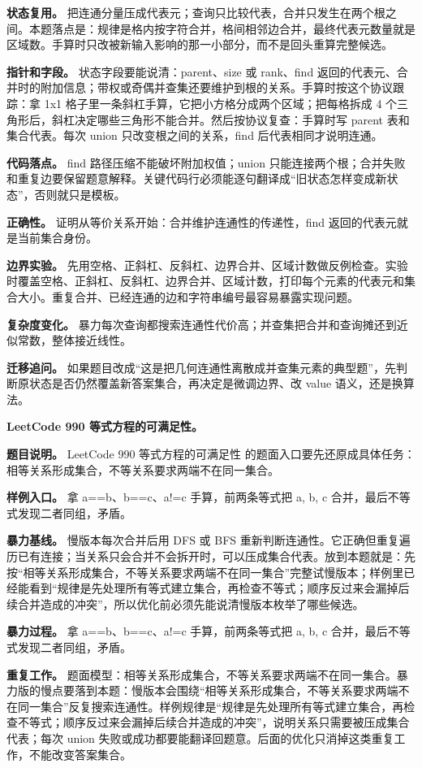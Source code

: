 \textbf{状态复用。} 把连通分量压成代表元；查询只比较代表，合并只发生在两个根之间。本题落点是：规律是格内按字符合并，格间相邻边合并，最终代表元数量就是区域数。手算时只改被新输入影响的那一小部分，而不是回头重算完整候选。

\textbf{指针和字段。} 状态字段要能说清：parent、size 或 rank、find 返回的代表元、合并时的附加信息；带权或奇偶并查集还要维护到根的关系。手算时按这个协议跟踪：拿 1x1 格子里一条斜杠手算，它把小方格分成两个区域；把每格拆成 4 个三角形后，斜杠决定哪些三角形不能合并。然后按协议复查：手算时写 parent 表和集合代表。每次 union 只改变根之间的关系，find 后代表相同才说明连通。

\textbf{代码落点。} find 路径压缩不能破坏附加权值；union 只能连接两个根；合并失败和重复边要保留题意解释。关键代码行必须能逐句翻译成“旧状态怎样变成新状态”，否则就只是模板。

\textbf{正确性。} 证明从等价关系开始：合并维护连通性的传递性，find 返回的代表元就是当前集合身份。

\textbf{边界实验。} 先用空格、正斜杠、反斜杠、边界合并、区域计数做反例检查。实验时覆盖空格、正斜杠、反斜杠、边界合并、区域计数，打印每个元素的代表元和集合大小。重复合并、已经连通的边和字符串编号最容易暴露实现问题。

\textbf{复杂度变化。} 暴力每次查询都搜索连通性代价高；并查集把合并和查询摊还到近似常数，整体接近线性。

\textbf{迁移追问。} 如果题目改成“这是把几何连通性离散成并查集元素的典型题”，先判断原状态是否仍然覆盖新答案集合，再决定是微调边界、改 value 语义，还是换算法。

\noindent\textbf{LeetCode 990 等式方程的可满足性。}

\textbf{题目说明。} LeetCode 990 等式方程的可满足性 的题面入口要先还原成具体任务：相等关系形成集合，不等关系要求两端不在同一集合。

\textbf{样例入口。} 拿 a==b、b==c、a!=c 手算，前两条等式把 a, b, c 合并，最后不等式发现二者同组，矛盾。

\textbf{暴力基线。} 慢版本每次合并后用 DFS 或 BFS 重新判断连通性。它正确但重复遍历已有连接；当关系只会合并不会拆开时，可以压成集合代表。放到本题就是：先按“相等关系形成集合，不等关系要求两端不在同一集合”完整试慢版本；样例里已经能看到“规律是先处理所有等式建立集合，再检查不等式；顺序反过来会漏掉后续合并造成的冲突”，所以优化前必须先能说清慢版本枚举了哪些候选。

\textbf{暴力过程。} 拿 a==b、b==c、a!=c 手算，前两条等式把 a, b, c 合并，最后不等式发现二者同组，矛盾。

\textbf{重复工作。} 题面模型：相等关系形成集合，不等关系要求两端不在同一集合。暴力版的慢点要落到本题：慢版本会围绕“相等关系形成集合，不等关系要求两端不在同一集合”反复搜索连通性。样例规律是“规律是先处理所有等式建立集合，再检查不等式；顺序反过来会漏掉后续合并造成的冲突”，说明关系只需要被压成集合代表；每次 union 失败或成功都要能翻译回题意。后面的优化只消掉这类重复工作，不能改变答案集合。


